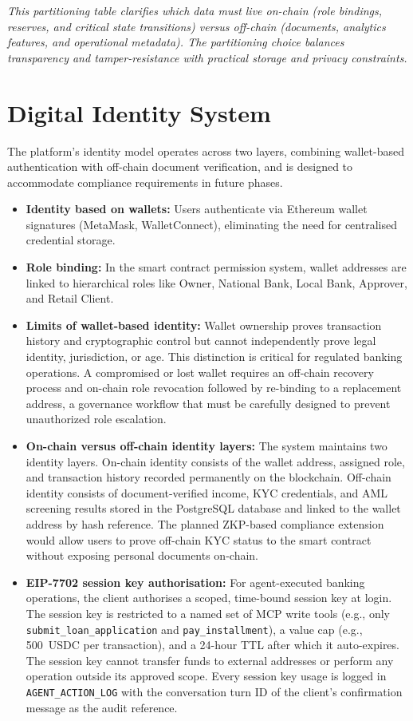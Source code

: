 \documentclass[12pt,a4paper]{report}
\begin{document}
\vspace{2pt}
\noindent\textit{\small This partitioning table clarifies which data must live on-chain (role bindings, reserves, and critical state transitions) versus off-chain (documents, analytics features, and operational metadata). The partitioning choice balances transparency and tamper-resistance with practical storage and privacy constraints.}


\section{Digital Identity System}

The platform's identity model operates across two layers, combining wallet-based authentication with off-chain document verification, and is designed to accommodate compliance requirements in future phases.

\begin{itemize}[noitemsep]
\item \textbf{Identity based on wallets:} Users authenticate via Ethereum wallet signatures (MetaMask, WalletConnect), eliminating the need for centralised credential storage.
\item \textbf{Role binding:} In the smart contract permission system, wallet addresses are linked to hierarchical roles like Owner, National Bank, Local Bank, Approver, and Retail Client.
\item \textbf{Limits of wallet-based identity:} Wallet ownership proves transaction history and cryptographic control but cannot independently prove legal identity, jurisdiction, or age. This distinction is critical for regulated banking operations. A compromised or lost wallet requires an off-chain recovery process and on-chain role revocation followed by re-binding to a replacement address, a governance workflow that must be carefully designed to prevent unauthorized role escalation.
\item \textbf{On-chain versus off-chain identity layers:} The system maintains two identity layers. On-chain identity consists of the wallet address, assigned role, and transaction history recorded permanently on the blockchain. Off-chain identity consists of document-verified income, KYC credentials, and AML screening results stored in the PostgreSQL database and linked to the wallet address by hash reference. The planned ZKP-based compliance extension would allow users to prove off-chain KYC status to the smart contract without exposing personal documents on-chain.
\item \textbf{EIP-7702 session key authorisation:} For agent-executed banking operations, the client authorises a scoped, time-bound session key at login. The session key is restricted to a named set of MCP write tools (e.g., only \texttt{submit\_loan\_application} and \texttt{pay\_installment}), a value cap (e.g., 500~USDC per transaction), and a 24-hour TTL after which it auto-expires. The session key cannot transfer funds to external addresses or perform any operation outside its approved scope. Every session key usage is logged in \texttt{AGENT\_ACTION\_LOG} with the conversation turn ID of the client's confirmation message as the audit reference.
\end{itemize}
\end{document}
